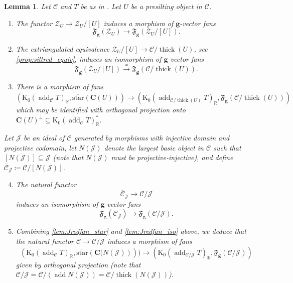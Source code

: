 \documentclass[10pt,twoside, a4paper,reqno]{amsart}
\DeclareMathOperator{\add}{add}
\DeclareMathOperator{\thick}{thick}
\newcommand{\partfan}[1]{\mathfrak{F}_{\bfg}(#1)}
\newcommand{\R}{\mathbb{R}}
\newcommand{\calC}{\mathcal{C}}
\newcommand{\calZ}{\mathcal{Z}}
\newcommand{\boldC}{\mathbf{C}}
\newcommand{\K}{\mathrm{K}}
\newcommand{\bfg}{\mathbf{g}}
\newtheorem{lemma}[theorem]{Lemma}
\theoremstyle{definition}
\begin{document}
\begin{lemma}\label{lem:Jredfan}
    Let $\calC$ and $T$ be as in . {Let $U$ be a presilting object in $\calC$.}
    \begin{enumerate}
    \item\label{lem:Jredfan1} The functor $\calZ_U \to \calZ_U/[U]$ induces a morphism of $\bfg$-vector fans 
    \[ \partfan{\calZ_U} \to \partfan{\calZ_U/[U]}. \]
    \item\label{lem:Jredfan2} The extriangulated equivalence $\calZ_U/[U] \to \calC/\thick(U)$, see \eqref{prop:siltred_equiv}, induces an isomorphism of $\bfg$-vector fans 
    \[ \partfan{\calZ_U/[U]} \xrightarrow{\simeq}  \partfan{\calC/\thick(U)}. \]
    \item\label{lem:Jredfan_star} 
    There is a morphism of fans 
    \[(\K_0(\add_{\calC} T)_\R,  \overline{\mathrm{star}}(\boldC(U))) \to (\K_0(\add_{\calC/\thick(U)} T)_\R,\partfan{\calC/\thick(U)}) \]
    which may be identified with orthogonal projection onto $\boldC(U)^\perp \subseteq \K_0(\add_{\calC} T)_\R^*$.
    \end{enumerate}
    Let $\mathcal{J}$ be an ideal of $\calC$ generated by morphisms with injective domain and projective codomain, let $N(\mathcal{J})$ denote the largest basic object in $\calC$ such that $[N{(\mathcal{J})}]\subseteq \mathcal{J}$ (note that $N(\mathcal{J})$ must be projective-injective), and define $\overline{\calC}_{\mathcal{J}}\coloneqq \calC/[N(\mathcal{J})]$.
    \begin{enumerate}
    \setcounter{enumi}{3}
    \item\label{lem:Jredfan_iso} The natural functor 
    \begin{equation}\label{eq:NtoJ}
        \overline{\calC}_{\mathcal{J}} \to \calC/\mathcal{J}
    \end{equation}
    induces an isomorphism of $\bfg$-vector fans
    \begin{equation}\label{eq:NtoJ_fan}
        \partfan{\overline{\calC}_{\mathcal{J}}} \to \partfan{\calC/\mathcal{J}}.
    \end{equation}
    \item\label{lem:Jredfan_combo} Combining \eqref{lem:Jredfan_star} and \eqref{lem:Jredfan_iso} above, we deduce that the natural functor $\calC\to \calC/\mathcal{J}$ induces a %
    {morphism of fans}
    \begin{equation*}
        (\K_0(\add_\calC T)_\R, \overline{\mathrm{star}}({\boldC(N(\mathcal{J})}))) \to (\K_0(\add_{\calC/\mathcal{J}} T)_\R, \partfan{\calC/\mathcal{J}})
    \end{equation*}
    given by orthogonal projection (note that $\calC/\mathcal{J} = \calC/(\add N(\mathcal{J})) = \calC / \thick(N(\mathcal{J}))$).
\end{enumerate}
\end{lemma}
\end{document}
